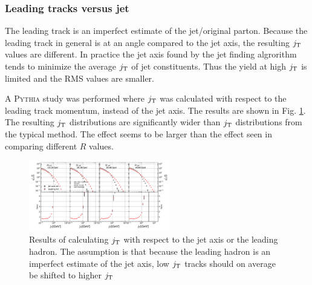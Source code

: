 

\subsubsection{Leading tracks versus jet}
\label{sec:reference}
The leading track is an imperfect estimate of the jet/original parton. Because the leading track in general is at an angle compared to the jet axis, the resulting $j_{\rm T}$ values are different. In practice the jet axis found by the jet finding algrorithm tends to minimize the average $j_{\rm T}$ of jet constituents. Thus the yield at high $j_{\rm T}$ is limited and the RMS values are smaller.

A \textsc{Pythia} study was performed where $j_{\rm T}$ was calculated with respect to the leading track momentum, instead of the jet axis. The results are shown in Fig. \ref{fig:RefComparison}. The resulting $j_{\rm T}$ distributions are significantly wider than $j_{\rm T}$ distributions from the typical method. The effect seems to be larger than the effect seen in comparing different $R$ values.

\begin{figure}[htp]
\centering
\includegraphics[width=0.55\textwidth]{figures/results/JetVsLeadingRefConst.pdf}
\caption{Results of calculating $j_{\rm T}$ with respect to the jet axis or the leading hadron. The assumption is that because the leading hadron is an imperfect estimate of the jet axis, low $j_{\rm T}$ tracks should on average be shifted to higher $j_{\rm T}$}
\label{fig:RefComparison}
\end{figure}


